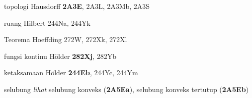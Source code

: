 topologi Hausdorff {\bf 2A3E}, 2A3L, 2A3Mb, 2A3S















































ruang Hilbert 244Na, 244Yk
















Teorema Hoeffding 272W, 272Xk, 272Xl


fungsi kontinu H\"older {\bf 282Xj}, 282Yb


ketaksamaan H\"older {\bf 244Eb}, 244Yc, 244Ym
























selubung {\it lihat} selubung konveks ({\bf 2A5Ea}), selubung konveks tertutup ({\bf 2A5Eb})


















